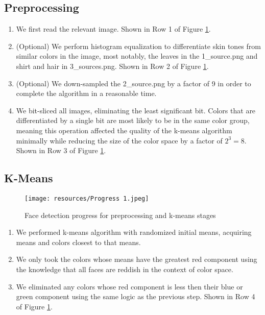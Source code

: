 \documentclass[conference]{IEEEtran}
\begin{document}
\subsection{Preprocessing}
\begin{enumerate}
	\item \label{step:A1} We first read the relevant image. Shown in Row 1 of Figure \ref{fig:pro1}.
	\item \label{step:A2} (Optional) We perform histogram equalization to differentiate skin tones from similar colors in the image, most notably, the leaves in the 1\_source.png and shirt and hair in 3\_sources.png. Shown in Row 2 of Figure \ref{fig:pro1}.
	\item \label{step:A3} (Optional) We down-sampled the 2\_source.png by a factor of 9 in order to complete the algorithm in a reasonable time. 
	\item \label{step:A4} We bit-sliced all images, eliminating the least significant bit. Colors that are differentiated by a single bit are most likely to be in the same color group, meaning this operation affected the quality of the k-means algorithm minimally while reducing the size of the color space by a factor of $2^3=8$. Shown in Row 3 of Figure \ref{fig:pro1}.
\end{enumerate}
\subsection{K-Means}
\begin{figure}[h]
    \centering
    \texttt{[image: resources/Progress 1.jpeg]}
    \caption{Face detection progress for preprocessing and k-means stages}
    \label{fig:pro1}
\end{figure}
\begin{enumerate}
	\item \label{step:B1} We performed k-means algorithm with randomized initial means, acquiring means and colors closest to that means.
	\item \label{step:B2} We only took the colors whose means have the greatest red component using the knowledge that all faces are reddish in the context of color space.
	\item \label{step:B3} We eliminated any colors whose red component is less then their blue or green component using the same logic as the previous step. Shown in Row 4 of Figure \ref{fig:pro1}.
\end{enumerate}
\end{document}
